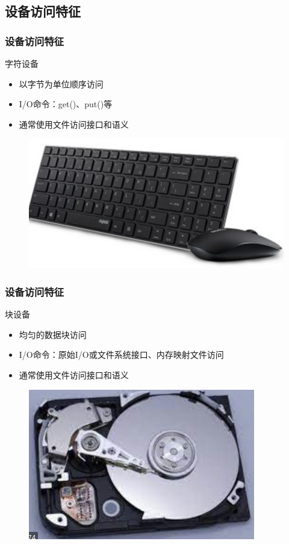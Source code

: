 \subsection{设备访问特征} %
\begin{frame}[fragile]
    \frametitle{设备访问特征}
    字符设备
    \begin{itemize}
        \item 以字节为单位顺序访问
        \item I/O命令：get()、put()等
        \item 通常使用文件访问接口和语义
    \end{itemize}
    \begin{figure}
    \includegraphics[width=0.4\linewidth]{figs/char-dev.png}
    \end{figure}
\end{frame}
% 
\begin{frame}[fragile]
    \frametitle{设备访问特征}
    块设备
    \begin{itemize}
        \item 均匀的数据块访问
        \item I/O命令：原始I/O或文件系统接口、内存映射文件访问
        \item 通常使用文件访问接口和语义
    \end{itemize}
    \begin{figure}
        \includegraphics[width=0.3\linewidth]{figs/blk-dev.png}
    \end{figure}
\end{frame}
